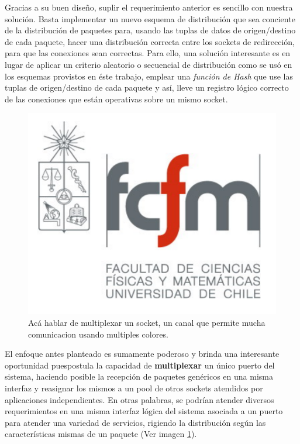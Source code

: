 Gracias a su buen diseño, suplir el requerimiento anterior es sencillo con nuestra solución. Basta implementar un nuevo esquema de distribución que sea conciente de la distribución de paquetes para, usando las tuplas de datos de origen/destino de cada paquete, hacer una distribución correcta entre los sockets de redirección, para que las conexiones sean correctas. Para ello, una solución interesante es en lugar de aplicar un criterio aleatorio o secuencial de distribución como se usó en los esquemas provistos en éste trabajo, emplear una \emph{función de Hash} que use las tuplas de origen/destino de cada paquete y así, lleve un registro lógico correcto de las conexiones que están operativas sobre un mismo socket.

\begin{figure}[!h]
	\centering
	\includegraphics[scale=.2]{imagenes/fcfm}
	\caption{Acá hablar de multiplexar un socket, un canal que permite mucha comunicacion usando multiples colores.}
	\label{fig:multiplexarPuerto}
\end{figure}

El enfoque antes planteado es sumamente poderoso y brinda una interesante oportunidad puespostula la capacidad de \textbf{multiplexar} un único puerto del sistema, haciendo posible la recepción de paquetes genéricos en una misma interfaz y reasignar los mismos a un pool de otros sockets atendidos por aplicaciones independientes. En otras palabras, se podrían atender diversos requerimientos en una misma interfaz lógica del sistema asociada a un puerto para atender una variedad de servicios, rigiendo la distribución según las características mismas de un paquete (Ver imagen \ref{fig:multiplexarPuerto}).

